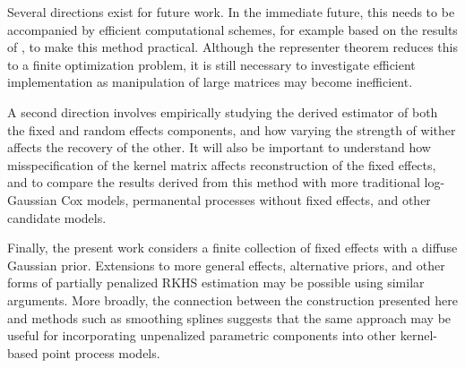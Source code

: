 \documentclass[ejsv2,preprint]{imsart}
\begin{document}
Several directions exist for future work. In the immediate future, this needs to be accompanied by efficient computational schemes, for example based on the results of \cite{pmlr-v54-flaxman17a}, to make this method practical. Although the representer theorem reduces this to a finite optimization problem, it is still necessary to investigate efficient implementation as manipulation of large matrices may become inefficient. 

A second direction involves empirically studying the derived estimator of both the fixed and random effects components, and how varying the strength of wither affects the recovery of the other. It will also be important to understand how misspecification of the kernel matrix affects reconstruction of the fixed effects, and to compare the results derived from this method with more traditional log-Gaussian Cox models, permanental processes without fixed effects, and other candidate models. 

Finally, the present work considers a finite collection of fixed effects with a diffuse Gaussian prior. Extensions to more general effects, alternative priors, and other forms of partially penalized RKHS estimation may be possible using similar arguments. More broadly, the connection between the construction presented here and methods such as smoothing splines suggests that the same approach may be useful for incorporating unpenalized parametric components into other kernel-based point process models.

% 
\newpage

\end{document}
